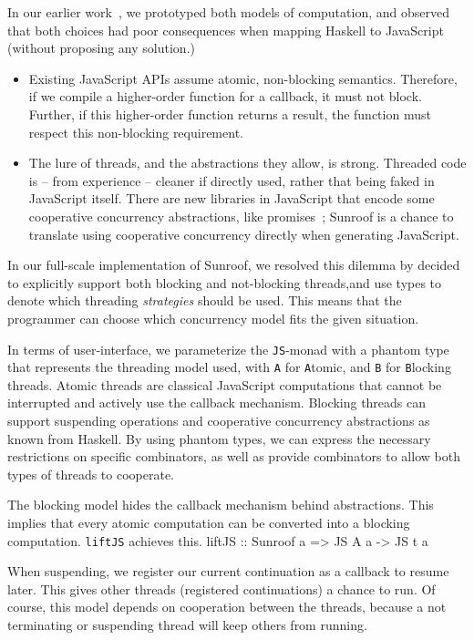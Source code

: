\documentclass{llncs}
\newcommand{\Src}[1]{{\tt{#1}}}
\newcommand{\JS}{\Src{JS}}
\newenvironment{Code}{\verbatim}{\endverbatim}
\begin{document}
In our earlier work~\cite{...}, we prototyped both models
of computation, and observed that both choices had poor consequences
when mapping Haskell to JavaScript (without proposing
any solution.)
\begin{itemize}
\item Existing JavaScript APIs assume atomic, non-blocking
semantics. Therefore, if we compile a higher-order function
for a callback, it must not block. 
Further, if this higher-order function returns a result, 
the function must respect this non-blocking requirement.
\item The lure of threads, and the abstractions they allow, 
is strong. Threaded code is -- from experience -- cleaner if 
directly used, rather that being faked in JavaScript itself.
There are new libraries in JavaScript that encode
some cooperative concurrency abstractions, like promises~\cite{...};
Sunroof is a chance to translate using cooperative concurrency 
directly when generating JavaScript.
\end{itemize}
In our full-scale implementation of Sunroof,
we resolved this dilemma by
decided to explicitly support both blocking
and not-blocking threads,and use types to denote which
threading {\em strategies\/} should be used.
This means that the programmer can choose which concurrency model fits
the given situation.

In terms of user-interface, we parameterize the \JS-monad
with a phantom type that represents the threading model used, 
with \Src{A} for \Src{A}tomic,
and \Src{B} for \Src{B}locking threads. 
Atomic threads are classical JavaScript computations that
cannot be interrupted and actively use the callback
mechanism. Blocking threads can
support suspending operations and cooperative concurrency
abstractions as known from Haskell. By using phantom
types, we can express the necessary
restrictions on specific combinators, as well
as provide combinators to allow both types of
threads to cooperate.

The blocking model hides the callback mechanism behind abstractions.
This implies that every atomic computation can be converted into 
a blocking computation. \Src{liftJS} achieves this.
\begin{Code}
liftJS :: Sunroof a => JS A a -> JS t a
\end{Code}

When suspending, we register our current
continuation as a callback to resume later. This gives other 
threads (registered continuations) a chance to run.
Of course, this model depends on cooperation between the threads,
because a not terminating or suspending thread will keep others from running.
\end{document}
